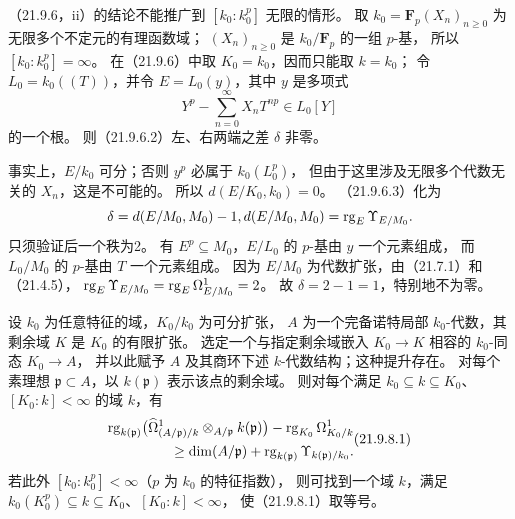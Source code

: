 （21.9.6，ii）的结论不能推广到 $[k_0:k_0^p]$ 无限的情形。
取 $k_0=\mathbf F_p(X_n)_{n\ge0}$ 为无限多个不定元的有理函数域；
$(X_n)_{n\ge0}$ 是 $k_0/\mathbf F_p$ 的一组 $p$-基，
所以 $[k_0:k_0^p]=\infty$。
在（21.9.6）中取 $K_0=k_0$，因而只能取 $k=k_0$；
令 $L_0=k_0((T))$，并令 $E=L_0(y)$，其中 $y$ 是多项式
\[
 Y^p-\sum_{n=0}^{\infty}X_nT^{np}\in L_0[Y]
\]
的一个根。
则（21.9.6.2）左、右两端之差 $\delta$ 非零。

事实上，$E/k_0$ 可分；否则 $y^p$ 必属于 $k_0(L_0^p)$，
但由于这里涉及无限多个代数无关的 $X_n$，这是不可能的。
所以 $d(E/K_0,k_0)=0$。
（21.9.6.3）化为
\[
 \delta=d(E/M_0,M_0)-1,
  d(E/M_0,M_0)=\operatorname{rg}_E\Upsilon_{E/M_0}.
\]
只须验证后一个秩为2。
有 $E^p\subseteq M_0$，$E/L_0$ 的 $p$-基由 $y$ 一个元素组成，
而 $L_0/M_0$ 的 $p$-基由 $T$ 一个元素组成。
因为 $E/M_0$ 为代数扩张，由（21.7.1）和（21.4.5），
$\operatorname{rg}_E\Upsilon_{E/M_0}=\operatorname{rg}_E\Omega^1_{E/M_0}=2$。
故 $\delta=2-1=1$，特别地不为零。

设 $k_0$ 为任意特征的域，$K_0/k_0$ 为可分扩张，
$A$ 为一个完备诺特局部 $k_0$-代数，其剩余域 $K$ 是 $K_0$ 的有限扩张。
选定一个与指定剩余域嵌入 $K_0\to K$ 相容的 $k_0$-同态 $K_0\to A$，
并以此赋予 $A$ 及其商环下述 $k$-代数结构；这种提升存在。
对每个素理想 $\mathfrak p\subset A$，以 $k(\mathfrak p)$ 表示该点的剩余域。
则对每个满足 $k_0\subseteq k\subseteq K_0$、$[K_0:k]<\infty$ 的域 $k$，有
\begin{equation}
\begin{split}
 \rk_{k(\mathfrak p)}
 \bigl(\widehat\Omega^1_{(A/\mathfrak p)/k}
           \otimes_{A/\mathfrak p}k(\mathfrak p)\bigr)
 -\rk_{K_0}\Omega^1_{K_0/k}\\
 \ge \dim(A/\mathfrak p)
       +\rk_{k(\mathfrak p)}\Upsilon_{k(\mathfrak p)/k_0}.
\end{split}\tag{21.9.8.1}
\end{equation}
若此外 $[k_0:k_0^p]<\infty$（$p$ 为 $k_0$ 的特征指数），
则可找到一个域 $k$，满足 $k_0(K_0^p)\subseteq k\subseteq K_0$、$[K_0:k]<\infty$，
使（21.9.8.1）取等号。

